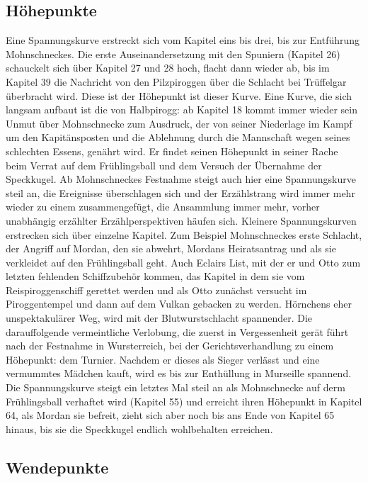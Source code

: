 \subsection{Höhepunkte}
Eine Spannungskurve erstreckt sich vom Kapitel eins bis drei, bis zur Entführung Mohnschneckes. Die erste Auseinandersetzung mit den Spuniern (Kapitel 26) schauckelt sich über Kapitel 27 und 28 hoch, flacht dann wieder ab, bis im Kapitel 39 die Nachricht von den Pilzpiroggen über die Schlacht bei Trüffelgar überbracht wird. Diese ist der Höhepunkt ist dieser Kurve. Eine Kurve, die sich langsam aufbaut ist die von Halbpirogg: ab Kapitel 18 kommt immer wieder sein Unmut über Mohnschnecke zum Ausdruck, der von seiner Niederlage im Kampf um den Kapitänsposten und die Ablehnung durch die Mannschaft wegen seines schlechten Essens, genährt wird. Er findet seinen Höhepunkt in seiner Rache beim Verrat auf dem Frühlingsball und dem Versuch der Übernahme der Speckkugel. Ab Mohnschneckes Festnahme steigt auch hier eine Spannungskurve steil an, die Ereignisse überschlagen sich und der Erzählstrang wird immer mehr wieder zu einem zusammengefügt, die Ansammlung immer mehr, vorher unabhängig erzählter Erzählperspektiven häufen sich. Kleinere Spannungskurven erstrecken sich über einzelne Kapitel. Zum Beispiel Mohnschneckes erste Schlacht, der Angriff auf Mordan, den sie abwehrt, Mordans Heiratsantrag und als sie verkleidet auf den Frühlingsball geht. Auch Eclairs List, mit der er und Otto zum letzten fehlenden Schiffzubehör kommen, das Kapitel in dem sie vom Reispiroggenschiff gerettet werden und als Otto zunächst versucht im Piroggentempel und dann auf dem Vulkan gebacken zu werden. Hörnchens eher unspektakulärer Weg, wird mit der Blutwurstschlacht spannender. Die darauffolgende vermeintliche Verlobung, die zuerst in Vergessenheit gerät führt nach der Festnahme in Wursterreich, bei der Gerichtsverhandlung zu einem Höhepunkt: dem Turnier. Nachdem er dieses als Sieger verlässt und eine vermummtes Mädchen kauft, wird es bis zur Enthüllung in Murseille spannend. Die Spannungskurve steigt ein letztes Mal steil an als Mohnschnecke auf derm Frühlingsball verhaftet wird (Kapitel 55) und erreicht ihren Höhepunkt in Kapitel 64, als Mordan sie befreit, zieht sich aber noch bis ans Ende von Kapitel 65 hinaus, bis sie die Speckkugel endlich wohlbehalten erreichen.

\subsection{Wendepunkte}

